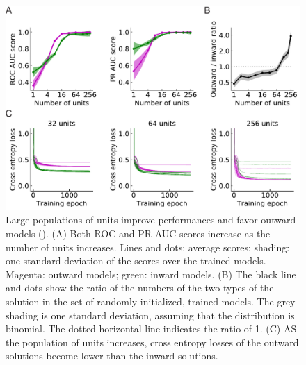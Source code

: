 \documentclass[pdftex,9pt,lineno]{elife}
\begin{document}
\begin{figure}
\includegraphics[width=\linewidth]{figures/outward_better_than_inward_paper.pdf}
\caption{Large populations of units improve performances and favor outward models (). (A) Both ROC and PR AUC scores increase as the number of units increases. Lines and dots: average scores; shading: one standard deviation of the scores over the trained models. Magenta: outward models; green: inward models. (B) The black line and dots show the ratio of the numbers of the two types of the solution in the set of randomly initialized, trained models. The grey shading is one standard deviation, assuming that the distribution is binomial. The dotted horizontal line indicates the ratio of 1. (C) AS the population of units increases, cross entropy losses of the outward solutions become lower than the inward solutions.}
\label{fig:outwardPrevail}

\end{figure}
\end{document}
